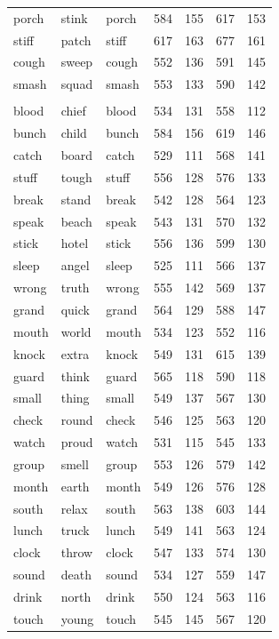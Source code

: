\documentclass[
]{interact}
\begin{document}
\begin{table}
\begin{tabular*}{\linewidth}{@{\extracolsep{\fill}}lllrrrr}
porch & stink & porch & 584 & 155 & 617 & 153 \\ 
stiff & patch & stiff & 617 & 163 & 677 & 161 \\ 
cough & sweep & cough & 552 & 136 & 591 & 145 \\ 
smash & squad & smash & 553 & 133 & 590 & 142 \\ 
\midrule\addlinespace[2.5pt]
\multicolumn{7}{l}{\emph{high frequency condition}} \\[2.5pt] 
\midrule\addlinespace[2.5pt]
blood & chief & blood & 534 & 131 & 558 & 112 \\ 
bunch & child & bunch & 584 & 156 & 619 & 146 \\ 
catch & board & catch & 529 & 111 & 568 & 141 \\ 
stuff & tough & stuff & 556 & 128 & 576 & 133 \\ 
break & stand & break & 542 & 128 & 564 & 123 \\ 
speak & beach & speak & 543 & 131 & 570 & 132 \\ 
stick & hotel & stick & 556 & 136 & 599 & 130 \\ 
sleep & angel & sleep & 525 & 111 & 566 & 137 \\ 
wrong & truth & wrong & 555 & 142 & 569 & 137 \\ 
grand & quick & grand & 564 & 129 & 588 & 147 \\ 
mouth & world & mouth & 534 & 123 & 552 & 116 \\ 
knock & extra & knock & 549 & 131 & 615 & 139 \\ 
guard & think & guard & 565 & 118 & 590 & 118 \\ 
small & thing & small & 549 & 137 & 567 & 130 \\ 
check & round & check & 546 & 125 & 563 & 120 \\ 
watch & proud & watch & 531 & 115 & 545 & 133 \\ 
group & smell & group & 553 & 126 & 579 & 142 \\ 
month & earth & month & 549 & 126 & 576 & 128 \\ 
south & relax & south & 563 & 138 & 603 & 144 \\ 
lunch & truck & lunch & 549 & 141 & 563 & 124 \\ 
clock & throw & clock & 547 & 133 & 574 & 130 \\ 
sound & death & sound & 534 & 127 & 559 & 147 \\ 
drink & north & drink & 550 & 124 & 563 & 116 \\ 
touch & young & touch & 545 & 145 & 567 & 120 \\ 

\end{tabular*}
\end{table}
\end{document}
